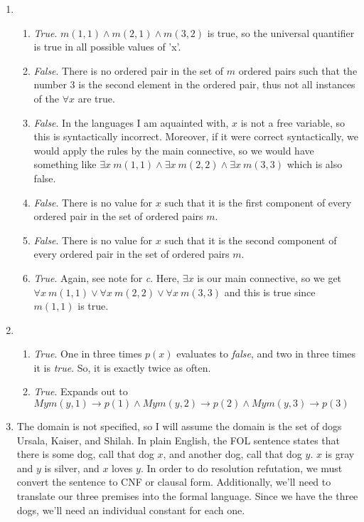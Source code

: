 \documentclass{article}
\begin{document}
\begin{enumerate}
\begin{enumerate}
    \end{enumerate}

    \item %
    \begin{enumerate}
        \item \textit{True}. $m(1,1) \wedge m(2,1) \wedge m(3, 2)$ is true, so the universal quantifier is true in all possible values of 'x'.
        \item \textit{False}. There is no ordered pair in the set of $m$ ordered pairs such that the number 3 is the second element in the ordered pair, thus not all instances of the $\forall x$ are true.
        \item \textit{False}. In the languages I am aquainted with, $x$ is not a free variable, so this is syntactically incorrect. Moreover, if it were correct syntactically, we would apply the rules by the main connective, so we would have something like $\exists x\ m(1,1) \wedge \exists x\ m(2, 2) \wedge \exists x\ m(3, 3)$ which is also false.
        \item \textit{False}. There is no value for $x$ such that it is the first component of every ordered pair in the set of ordered pairs $m$.
        \item \textit{False}. There is no value for $x$ such that it is the second component of every ordered pair in the set of ordered pairs $m$.
        \item \textit{True}. Again, see note for \textit{c}. Here, $\exists x$ is our main connective, so we get $\forall x\ m(1,1) \vee \forall x\ m(2, 2) \vee \forall x\ m(3, 3)$ and this is true since $m(1,1)$ is true.
    \end{enumerate}
    \item
    \begin{enumerate}
        \item \textit{True}. One in three times $p(x)$ evaluates to \textit{false}, and two in three times it is \textit{true}. So, it is exactly twice as often.
        \item \textit{True}. Expands out to $My m(y,1) \rightarrow p(1) \wedge My m(y,2) \rightarrow p(2) \wedge My m(y,3) \rightarrow p(3)$
    \end{enumerate}
    \item %
    The domain is not specified, so I will assume the domain is the set of dogs Ursala, Kaiser, and Shilah. In plain English, the FOL sentence states that there is some dog, call that dog $x$, and another dog, call that dog $y$. $x$ is gray and $y$ is silver, and $x$ loves $y$. In order to do resolution refutation, we must convert the sentence to CNF or clausal form. Additionally, we'll need to translate our three premises into the formal language. Since we have the three dogs, we'll need an individual constant for each one.\\\\

\end{enumerate}
\end{document}
